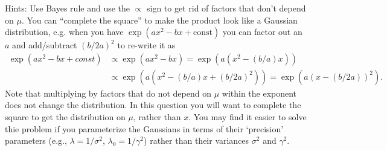 \documentclass{article}
\begin{document}
Hints: Use Bayes rule and use the $\propto$ sign to get rid of factors that don't depend on $\mu$. You can ``complete the square'' to make the product look like a Gaussian distribution, e.g. when you have $\exp(ax^2 - bx + \text{const})$ you can factor out an $a$ and add/subtract $(b/2a)^2$ to re-write it as
\begin{align*}
\exp\left(ax^2 - bx + const\right) & \propto
\exp\left(ax^2 - bx\right) = \exp\left(a(x^2 - (b/a)x)\right) \\& \propto \exp\left(a(x^2 - (b/a)x + (b/2a)^2)\right) =  \exp\left(a(x - (b/2a))^2\right).
\end{align*}
Note that multiplying by factors that do not depend on $\mu$ within the exponent does not change the distribution. In this question you will want to complete the square to get the distribution on $\mu$, rather than $x$.
You may find it easier to solve thie problem if you parameterize the Gaussians in terms of their `precision' parameters (e.g., $\lambda = 1/\sigma^2$, $\lambda_0 = 1/\gamma^2$) rather than their variances $\sigma^2$ and $\gamma^2$.

\newpage
\end{document}
